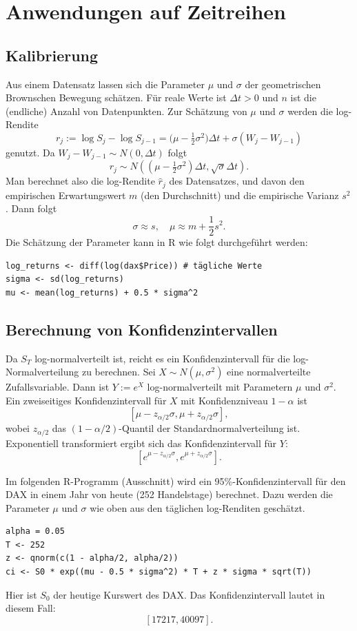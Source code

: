 \section{Anwendungen auf Zeitreihen}

\subsection{Kalibrierung}
Aus einem Datensatz lassen sich die Parameter $\mu$ und $\sigma$ der
geometrischen Brownschen Bewegung schätzen. 
Für reale Werte ist $\Delta t \gt 0$ und $n$ ist die (endliche) Anzahl von Datenpunkten. 
Zur Schätzung von $\mu$ und $\sigma$ werden die log-Rendite
$$r_j := \log S_j - \log S_{j-1}= \big(\mu - \tfrac12 \sigma^2\big)\Delta t + \sigma (W_j - W_{j-1})$$
genutzt. Da $W_j - W_{j-1} \sim N(0, \Delta t)$ folgt
$$r_j \sim N((\mu - \tfrac12 \sigma^2)\Delta t, \sqrt{\sigma} \Delta t).$$
Man berechnet also die log-Rendite $\hat r_j$ des Datensatzes, 
und davon den empirischen Erwartungswert $m$ (den Durchschnitt) und die empirische Varianz $s^2$. 
Dann folgt $$\sigma \approx s,\quad \mu \approx m + \frac{1}{2} s^2.$$
Die Schätzung der Parameter kann in R wie folgt durchgeführt werden:

\begin{lstlisting}
log_returns <- diff(log(dax$Price)) # tägliche Werte
sigma <- sd(log_returns)
mu <- mean(log_returns) + 0.5 * sigma^2
\end{lstlisting}

\subsection{Berechnung von Konfidenzintervallen}

Da $S_T$ log-normalverteilt ist, reicht es ein Konfidenzintervall für die log-Normalverteilung
zu berechnen.
Sei $X \sim N(\mu, \sigma^2)$ eine normalverteilte Zufallsvariable.
Dann ist $Y := e^X$ log-normalverteilt mit Parametern $\mu$ und $\sigma^2$.
Ein zweiseitiges Konfidenzintervall für $X$ mit Konfidenzniveau $1-\alpha$ ist
$$[\mu - z_{\alpha/2} \sigma, \mu + z_{\alpha/2} \sigma],$$
wobei $z_{\alpha/2}$ das $(1-\alpha/2)$-Quantil der Standardnormalverteilung ist.
Exponentiell transformiert ergibt sich das Konfidenzintervall für $Y$:
$$[e^{\mu - z_{\alpha/2} \sigma}, e^{\mu + z_{\alpha/2} \sigma}].$$

\begin{bsp}

Im folgenden R-Programm (Ausschnitt) wird ein 95\%-Konfidenzintervall für den DAX in einem Jahr von heute (252 Handelstage) berechnet.
Dazu werden die Parameter $\mu$ und $\sigma$ wie oben aus den täglichen log-Renditen geschätzt.

\begin{lstlisting}
alpha = 0.05
T <- 252
z <- qnorm(c(1 - alpha/2, alpha/2))
ci <- S0 * exp((mu - 0.5 * sigma^2) * T + z * sigma * sqrt(T))
\end{lstlisting}

Hier ist $S_0$ der heutige Kurswert des DAX. Das Konfidenzintervall lautet in diesem Fall:
$$[17217, 40097].$$

\end{bsp}

